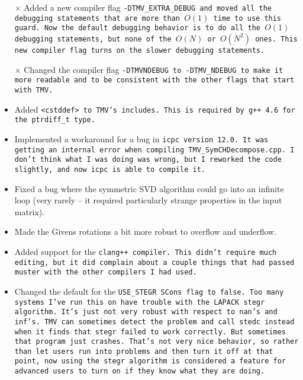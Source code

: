 \begin{itemize}
\item[$\times$]
Added a new compiler flag \tt{-DTMV\_EXTRA\_DEBUG} and moved all the debugging statements that are more than $O(1)$ time to use this guard.  Now the default debugging behavior is to do all the $O(1)$ debugging statements, but none of the $O(N)$ or $O(N^2)$ ones.  This new compiler flag turns on the slower debugging statements.

\item[$\times$]
Changed the compiler flag \tt{-DTMVNDEBUG} to \tt{-DTMV\_NDEBUG} to make it more readable and to be consistent with the other flags that start with \tt{TMV}.

\item
Added \tt{<cstddef>} to TMV's includes.
This is required by g++ 4.6 for the \tt{ptrdiff\_t} type.

\item
Implemented a workaround for a bug in \tt{icpc} version 12.0.
It was getting an internal
error when compiling \tt{TMV\_SymCHDecompose.cpp}.  I don't think what I was 
doing was wrong, but I reworked the code slightly, and now \tt{icpc} is able
to compile it.

\item
Fixed a bug where the symmetric SVD algorithm could go into an infinite loop (very rarely -- it required particularly strange properties in the input matrix).
 
\item
Made the Givens rotations a bit more robust to overflow and underflow.

\item 
Added support for the \tt{clang++} compiler.  This didn't require much editing, but it did complain about a couple things that had passed muster with the other compilers I had used.

\item
Changed the default for the \tt{USE\_STEGR} SCons flag to \tt{false}.  Too many
systems I've run this on have trouble with the LAPACK \tt{stegr} algorithm.
It's just not very robust with respect to \tt{nan}'s and \tt{inf}'s.  TMV can
sometimes detect the problem and call \tt{stedc} instead when it finds 
that \tt{stegr} failed to work correctly.  But sometimes that program just
crashes.  That's not very nice behavior, so rather than let users run 
into problems and then turn it off at that point, now
using the \tt{stegr} algorithm is considered a feature for advanced users to turn on if 
they know what they are doing.


\end{itemize}
